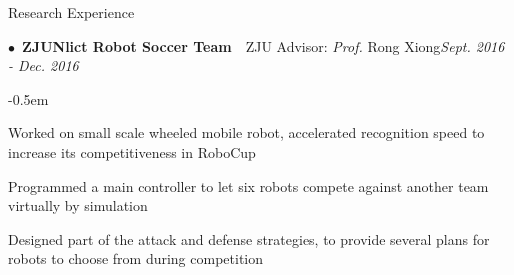 \documentclass{resume} %
\begin{document}
\begin{rSection}{Research Experience}

\begin{spacing}{0.4}
$\bullet$~{\bf ZJUNlict Robot Soccer Team}~~{ZJU Advisor: {\em Prof.} Rong Xiong}\hfill{\em Sept. 2016 - Dec. 2016}\smallskip\\
\end{spacing}
\begin{list}{--}{\leftmargin=1em}
	\itemsep -0.5em \vspace{-0.5em}
\item Worked on small scale wheeled mobile robot, accelerated recognition speed to increase its competitiveness in RoboCup
\item Programmed a main controller to let six robots compete against another team virtually by simulation
\item Designed part of the attack and defense strategies, to provide several plans for robots to choose from during competition

\end{list}




\end{rSection}
\end{document}
